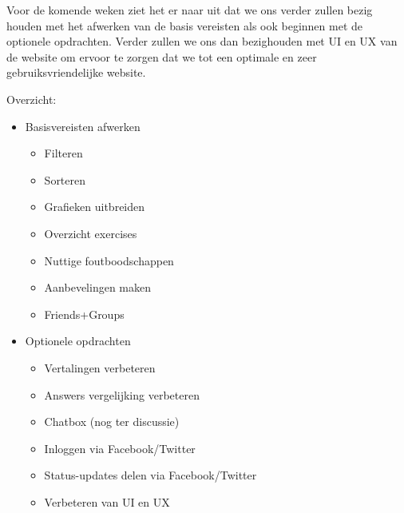 Voor de komende weken ziet het er naar uit dat we ons verder zullen bezig houden met het afwerken van de basis 
vereisten als ook beginnen met de optionele opdrachten. Verder zullen we ons dan bezighouden met UI en UX van de
website om ervoor te zorgen dat we tot een optimale en zeer gebruiksvriendelijke website.

Overzicht:
\begin{itemize}
	\item Basisvereisten afwerken
	\begin{itemize}
		\item Filteren
		\item Sorteren
		\item Grafieken uitbreiden
		\item Overzicht exercises
		\item Nuttige foutboodschappen
		\item Aanbevelingen maken
		\item Friends+Groups
	\end{itemize}
	\item Optionele opdrachten
	\begin{itemize}
		\item Vertalingen verbeteren
		\item Answers vergelijking verbeteren
		\item Chatbox (nog ter discussie)
		\item Inloggen via Facebook/Twitter
		\item Status-updates delen via Facebook/Twitter
		\item Verbeteren van UI en UX
	\end{itemize}
\end{itemize}


